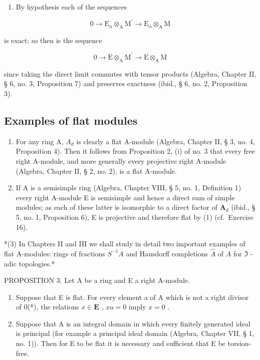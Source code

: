 \begin{enumerate}
\def\labelenumi{(\roman{enumi})}
\setcounter{enumi}{1}
\tightlist
\item
  By hypothesis each of the sequences
\end{enumerate}

\[
0 \rightarrow \mathrm{E} _ {\alpha} \otimes_ {\mathrm{A}} \mathrm{M} ^ {\prime} \rightarrow \mathrm{E} _ {\alpha} \otimes_ {\mathrm{A}} \mathrm{M}
\]

is exact; so then is the sequence

\[
0 \rightarrow \mathrm{E} \otimes_ {\mathrm{A}} \mathrm{M} ^ {\prime} \rightarrow \mathrm{E} \otimes_ {\mathrm{A}} \mathrm{M}
\]

since taking the direct limit commutes with tensor products (Algebra, Chapter II, § 6, no. 3, Proposition 7) and preserves exactness (ibid., § 6, no. 2, Proposition 3).

\subsection{Examples of flat modules}

\begin{enumerate}
\def\labelenumi{(\arabic{enumi})}
\item
  For any ring A, \(A_{d}\) is clearly a flat A-module (Algebra, Chapter II, § 3, no. 4, Proposition 4). Then it follows from Proposition 2, (i) of no. 3 that every free right A-module, and more generally every projective right A-module (Algebra, Chapter II, § 2, no. 2), is a flat A-module.
\item
  If A is a semisimple ring (Algebra, Chapter VIII, § 5, no. 1, Definition 1) every right A-module E is semisimple and hence a direct sum of simple modules; as each of these latter is isomorphic to a direct factor of \(\mathbf{A}_d\) (ibid., § 5, no. 1, Proposition 6), E is projective and therefore flat by (1) (cf.~Exercise 16).
\end{enumerate}

*(3) In Chapters II and III we shall study in detail two important examples of flat A-modules: rings of fractions \(S^{-1}A\) and Hausdorff completions \(\hat{A}\) of \(A\) for \(\mathfrak{I}\) -adic topologies.*

PROPOSITION 3. Let A be a ring and E a right A-module.

\begin{enumerate}
\def\labelenumi{(\roman{enumi})}
\item
  Suppose that E is flat. For every element a of A which is not a right divisor of 0(*), the relations \(x \in \mathbf{E}\) , \(xa = 0\) imply \(x = 0\) .
\item
  Suppose that A is an integral domain in which every finitely generated ideal is principal (for example a principal ideal domain (Algebra, Chapter VII, § 1, no. 1)). Then for E to be flat it is necessary and sufficient that E be torsion-free.
\end{enumerate}

